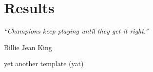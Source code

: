 \chapter{Results}
\label{ch:results}
\epigraph{\emph{“Champions keep playing until they get it right.”}}{Billie Jean King}

yet another template (yat)